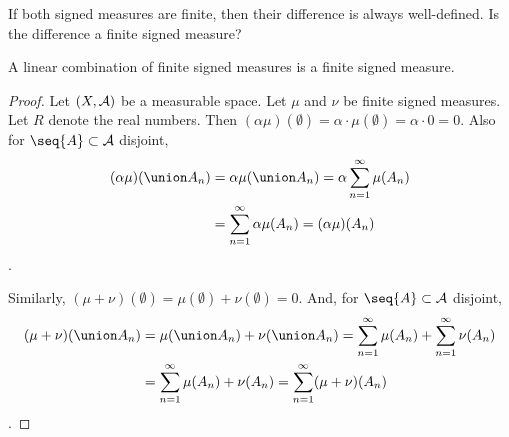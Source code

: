 
\sbasic




































\sstart
{}


If both signed measures are finite,
then their difference is always
well-defined.
Is the difference a finite signed
measure?


\begin{prop}
A linear combination of
finite signed measures is
a finite signed measure.
\begin{proof}
Let $(X,\mathcal{A})$ be a measurable space.
Let $\mu$ and $\nu$ be finite signed measures.
Let $R$ denote the real numbers.
Then $(\alpha\mu)(\emptyset) = \alpha \cdot \mu(\emptyset) = \alpha \cdot 0 = 0$.
Also for $\seq{A} \subset \SA$ disjoint,
$$
\begin{aligned}
  (\alpha\mu)(\union A_n) &= \alpha \mu(\union A_n)
  = \alpha \sum_{n = 1}^{\infty} \mu(A_n) \\ &= \sum_{n = 1}^{\infty} \alpha \mu(A_n) = (\alpha\mu)(A_n)
\end{aligned}
$$.

Similarly,
$(\mu + \nu)(\emptyset) = \mu(\emptyset) + \nu(\emptyset) = 0$.
And,
for $\seq{A} \subset \SA$ disjoint,
$$
\begin{aligned}
  (\mu + \nu)(\union A_n) &= \mu(\union A_n) + \nu(\union A_n)
  = \sum_{n = 1}^{\infty} \mu(A_n) +
  \sum_{n = 1}^{\infty} \nu(A_n) \\
  &= \sum_{n = 1}^{\infty} \mu(A_n) + \nu(A_n)
  = \sum_{n = 1}^{\infty} (\mu + \nu)(A_n)
\end{aligned}
$$.
\end{proof}
\end{prop}

